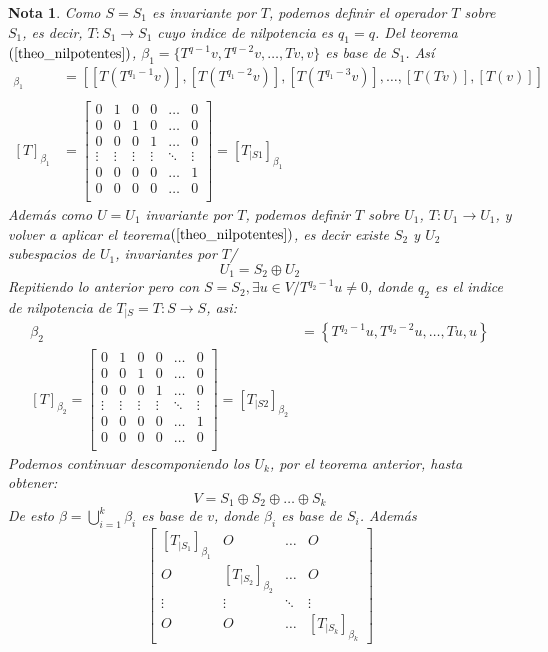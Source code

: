 \documentclass[10pt,a4paper]{article}
\newtheorem{mynote}{Nota}
\begin{document}
\begin{mynote}
	Como $S = S_{1}$ es invariante por $T$, podemos definir el operador $T$ sobre $S_{1}$, es decir, $T:S_{1}\rightarrow S_{1}$ cuyo indice de nilpotencia es $q_{1} = q$.
Del teorema $(\ref{theo_nilpotentes})$, $\beta_{1} = \{T^{q-1}v, T^{q-2}v,\ldots,Tv, v\}$ es base de $S_{1}$.
Así 
\begin{align*}
	[T]_{\beta_{1}} &= 
	\left[
	\left[T\left(T^{q_{1}-1}v\right)\right], 
	\left[T\left(T^{q_{1}-2}v\right)\right],
	\left[T\left(T^{q_{1}-3}v\right)\right],
	\ldots,
	\left[T\left(Tv\right)\right],
	\left[T\left(v\right)\right]	
	\right]\\\\
	[T]_{\beta_{1}} &= 
	\begin{bmatrix}
		0	&	1	&	0	&	0	&	\ldots	&	0\\
		0	&	0	&	1	&	0	&	\ldots	&	0\\
		0	&	0	&	0	&	1	&	\ldots	&	0\\
		\vdots	&	\vdots	&	\vdots	&	\vdots	&	\ddots	&	\vdots\\
		0	&	0	&	0	&	0	&	\ldots	&	1\\
		0	&	0	&	0	&	0	&	\ldots	&	0\\
	\end{bmatrix} = [T_{|S1}]_{\beta_{1}}
\end{align*}
Además como $U = U_{1}$ invariante por $T$, podemos definir $T$ sobre $U_{1}$, $T: U_{1}\rightarrow U_{1}$, y volver a aplicar el \textit{teorema}$(\ref{theo_nilpotentes})$, es decir existe $S_{2}$ y $U_{2}$ subespacios de $U_{1}$, invariantes por $T$/
$$U_{1} = S_{2}\oplus U_{2}$$
Repitiendo lo anterior pero con $S = S_{2},\exists u\in V/T^{q_{2}-1}u\neq 0$, donde $q_{2}$ es el indice de nilpotencia de $T_{|S} = T:S\rightarrow S$, asi:
\begin{align*}
	\beta_{2} &= \left\{T^{q_{2}-1}u, T^{q_{2}-2}u,\ldots,Tu, u\right\}\\
	[T]_{\beta_{2}} = 
	\begin{bmatrix}
		0	&	1	&	0	&	0	&	\ldots	&	0\\
		0	&	0	&	1	&	0	&	\ldots	&	0\\
		0	&	0	&	0	&	1	&	\ldots	&	0\\
		\vdots	&	\vdots	&	\vdots	&	\vdots	&	\ddots	&	\vdots\\
		0	&	0	&	0	&	0	&	\ldots	&	1\\
		0	&	0	&	0	&	0	&	\ldots	&	0\\
	\end{bmatrix} = [T_{|S2}]_{\beta_{2}}
\end{align*}
Podemos continuar descomponiendo los $U_{k}$, por el teorema anterior, hasta obtener:
$$V = S_{1}\oplus S_{2}\oplus \ldots \oplus S_{k}$$
De esto $\beta = \bigcup_{i=1}^{k}\beta_{i}$ es base de $v$, donde $\beta_{i}$ es base de $S_{i}$.
Además
$$\begin{bmatrix}
	\left[T_{|S_{1}}\right]_{\beta_{1}}	&	O	&	\ldots	&	O\\
	O	&	\left[T_{|S_{2}}\right]_{\beta_{2}}	&	\ldots	&	O\\
	\vdots	&	\vdots	& \ddots	& \vdots\\
	O	&	O	&	\ldots	&	\left[T_{|S_{k}}\right]_{\beta_{k}}
\end{bmatrix}$$
\end{mynote}
\end{document}
